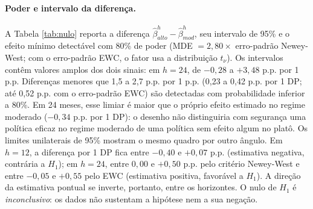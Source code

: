 \documentclass[12pt,a4paper]{article}
\begin{document}
\paragraph{Poder e intervalo da diferença.} A Tabela \ref{tab:nulo} reporta a diferença $\hat{\beta}_{alto}^h - \hat{\beta}_{mod}^h$, seu intervalo de 95\% e o efeito mínimo detectável com 80\% de poder (MDE $= 2{,}80 \times$ erro-padrão Newey-West; com o erro-padrão EWC, o fator usa a distribuição $t_\nu$). Os intervalos contêm valores amplos dos dois sinais: em $h = 24$, de $-0{,}28$ a $+3{,}48$ p.p. por 1 p.p. Diferenças menores que 1,5 a 2,7 p.p. por 1 p.p. (0,23 a 0,42 p.p. por 1 DP; até 0,52 p.p. com o erro-padrão EWC) são detectadas com probabilidade inferior a 80\%. Em 24 meses, esse limiar é maior que o próprio efeito estimado no regime moderado ($-0{,}34$ p.p. por 1 DP): o desenho não distinguiria com segurança uma política eficaz no regime moderado de uma política sem efeito algum no platô. Os limites unilaterais de 95\% mostram o mesmo quadro por outro ângulo. Em $h = 12$, a diferença por 1 DP fica entre $-0{,}40$ e $+0{,}07$ p.p. (estimativa negativa, contrária a $H_1$); em $h = 24$, entre $0{,}00$ e $+0{,}50$ p.p. pelo critério Newey-West e entre $-0{,}05$ e $+0{,}55$ pelo EWC (estimativa positiva, favorável a $H_1$). A direção da estimativa pontual se inverte, portanto, entre os horizontes. O nulo de $H_1$ é \emph{inconclusivo}: os dados não sustentam a hipótese nem a sua negação.
\end{document}
